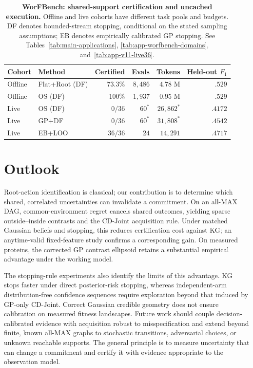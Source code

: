 \documentclass{article}
\theoremstyle{plain}
\theoremstyle{definition}
\begin{document}
\begin{table}[H]
\centering\small
\caption{\textbf{WorFBench: shared-support certification and uncached execution.}
Offline and live cohorts have different task pools and budgets.
DF denotes bounded-stream stopping, conditional on the stated
sampling assumptions; EB denotes empirically calibrated GP stopping.
See Tables~\ref{tab:main-applications},
\ref{tab:app-worfbench-domains}, and~\ref{tab:app-v11-live36}.}
\label{tab:main-worfbench}
\setlength{\tabcolsep}{4pt}
\begin{tabular}{@{}llrrrr@{}}
\toprule
Cohort & Method & Certified & Evals & Tokens & Held-out $F_1$\\
\midrule
Offline & Flat+Root (DF) & $73.3\%$ & $8{,}486$ & $4.78$ M & $.529$\\
Offline & OS (DF) & $100\%$ & $1{,}937$ & $0.95$ M & $.529$\\
\midrule
Live & OS (DF) & $0/36$ & $60^*$ & $26{,}862^*$ & $.4172$\\
Live & GP+DF & $0/36$ & $60^*$ & $31{,}808^*$ & $.4542$\\
Live & EB+LOO & $36/36$ & $24$ & $14{,}291$ & $.4717$\\
\bottomrule
\end{tabular}
\end{table}

\section{Outlook}
\label{sec:discussion}
Root-action identification is classical; our contribution is to determine which shared, correlated uncertainties can invalidate a commitment. On an all-MAX DAG, common-environment regret cancels shared outcomes, yielding sparse outside--inside contrasts and the CD-Joint acquisition rule. Under matched Gaussian beliefs and stopping, this reduces certification cost against KG; an anytime-valid fixed-feature study confirms a corresponding gain. On measured proteins, the corrected GP contrast ellipsoid retains a substantial empirical advantage under the working model.

The stopping-rule experiments also identify the limits of this advantage. KG stops faster under direct posterior-risk stopping, whereas independent-arm distribution-free confidence sequences require exploration beyond that induced by GP-only CD-Joint. Correct Gaussian credible geometry does not ensure calibration on measured fitness landscapes. Future work should couple decision-calibrated evidence with acquisition robust to misspecification and extend beyond finite, known all-MAX graphs to stochastic transitions, adversarial choices, or unknown reachable supports. The general principle is to measure uncertainty that can change a commitment and certify it with evidence appropriate to the observation model.
\label{main:lastpage}
\end{document}
